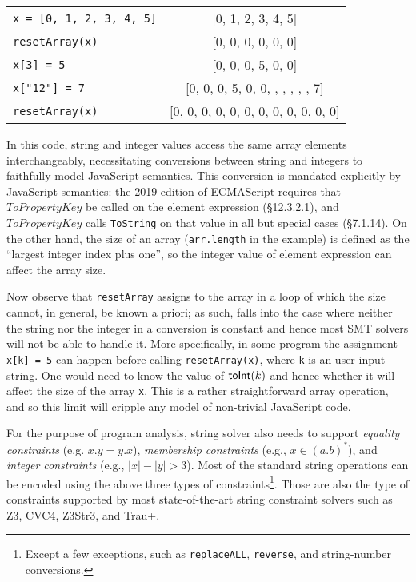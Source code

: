 \documentclass[sigplan,review,anonymous]{acmart}\settopmatter{printfolios=true,printccs=false,printacmref=false}
\begin{document}
\begin{tabular}{l|c}
	{\tt{x = [0, 1, 2, 3, 4, 5]}} & [0, 1, 2, 3, 4, 5] \\
	{\tt{resetArray(x)}} & [0, 0, 0, 0, 0, 0] \\
	{\tt{x[3] = 5}} & [0, 0, 0, 5, 0, 0] \\
	{\tt{x["12"] = 7}} & [0, 0, 0, 5, 0, 0, , , , , , 7] \\
	{\tt{resetArray(x)}} & [0, 0, 0, 0, 0, 0, 0, 0, 0, 0, 0, 0] \\
\end{tabular}

In this code, string and integer values access the same array elements interchangeably, necessitating conversions between string and integers to faithfully model JavaScript semantics.  This conversion is mandated explicitly by JavaScript semantics: the 2019 edition of ECMAScript requires that $ToPropertyKey$ be called on the element expression (\S{12.3.2.1}), and $ToPropertyKey$ calls {\tt{ToString}} on that value in all but special cases (\S{7.1.14}). On the other hand, the size of an array ({\tt{arr.length}} in the example) is defined as the ``largest integer index plus one'', so the integer value of element expression can affect the array size.

Now observe that {\tt{resetArray}} assigns to the array in a loop of which the size cannot, in general, be known a priori; as such, falls into the case where neither the string nor the integer in a conversion is constant and hence most SMT solvers will not be able to handle it. More specifically, in some program the assignment {\tt{x[k] = 5}} can happen before calling {\tt{resetArray(x)}}, where {\tt{k}} is an user input string. One would need to know the value of $\mbox{\textsf{toInt}($k$)}$ and hence whether it will affect the size of the array {\tt{x}}. This is a rather straightforward array operation, and so this limit will cripple any model of non-trivial JavaScript code. 

For the purpose of program analysis, string solver also needs to support \emph{equality constraints} (e.g. $x.y = y.x$), \emph{membership constraints} (e.g., $x \in (a.b)^*$), and \emph{integer constraints} (e.g., $|x|-|y|>3$). Most of the standard string operations can be encoded using the above three types of constraints\footnote{Except a few exceptions, such as {\tt{replaceALL}}, {\tt{reverse}}, and string-number conversions.}. Those are also the type of constraints supported by most state-of-the-art string constraint solvers such as Z3, CVC4, Z3Str3, and Trau+. \\
\end{document}
